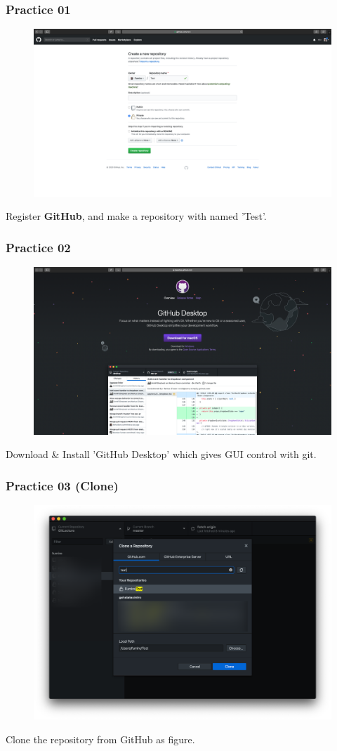 \documentclass[aspectratio=169]{beamer}
\begin{document}
	\begin{frame}
		\frametitle{Practice 01}
		
		\begin{figure}
			\centering
			\includegraphics[width=0.6 \linewidth]{figures/1.png}
		\end{figure}
	
		Register \textbf{GitHub}, and make a repository with named 'Test'.
	\end{frame}

	\begin{frame}
		\frametitle{Practice 02}
		
		\begin{figure}
			\centering
			\includegraphics[width=0.6 \linewidth]{figures/2.png}
		\end{figure}
	
		Download \& Install 'GitHub Desktop' which gives GUI control with git. 
	\end{frame}

	\begin{frame}
		\frametitle{Practice 03 (Clone)}
		
		\begin{figure}
			\centering
			\includegraphics[width=0.5 \linewidth]{figures/3.png}
		\end{figure}
	
		Clone the repository from GitHub as figure. 
	\end{frame}
\end{document}
